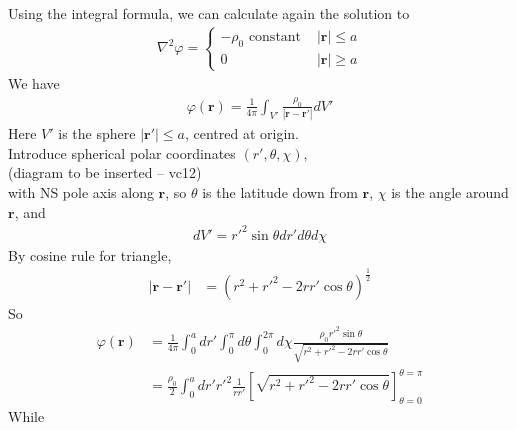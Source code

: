 \documentclass[a4paper]{article}
\begin{document}
\begin{eg}
Using the integral formula, we can calculate again the solution to
\begin{equation*}
\begin{aligned}
\nabla^2\varphi = \left\{
\begin{array}{ll}
-\rho_0 \text{   constant   } & |\mathbf{r}|\leq a\\
0 & |\mathbf{r}|\geq a
\end{array}
\right.
\end{aligned}
\end{equation*}
We have
\begin{equation*}
\begin{aligned}
\varphi\left(\mathbf{r}\right) = \frac{1}{4\pi}\int_{V'} \frac{\rho_0}{|\mathbf{r}-\mathbf{r}'|} dV'
\end{aligned}
\end{equation*}
Here $V'$ is the sphere $|\mathbf{r}'| \leq a$, centred at origin.\\
Introduce spherical polar coordinates $\left(r',\theta,\chi\right)$,\\
(diagram to be inserted -- vc12)\\
with NS pole axis along $\mathbf{r}$, so $\theta$ is the latitude down from $\mathbf{r}$, $\chi$ is the angle around $\mathbf{r}$, and
\begin{equation*}
\begin{aligned}
dV' = r'^2 \sin\theta dr' d\theta d\chi
\end{aligned}
\end{equation*}
By cosine rule for triangle,
\begin{equation*}
\begin{aligned}
|\mathbf{r}-\mathbf{r}'| &= \left(r^2+r'^2 - 2rr' \cos \theta\right) ^\frac{1}{2}
\end{aligned}
\end{equation*}
So
\begin{equation*}
\begin{aligned}
\varphi\left(\mathbf{r}\right) &= \frac{1}{4\pi} \int_0^a dr' \int_0^\pi d\theta \int_0^{2\pi} d\chi \frac{\rho_0 r'^2\sin\theta}{\sqrt{r^2+r'^2-2rr'\cos\theta}}\\
&=\frac{\rho_0}{2} \int_0^a dr' r'^2 \frac{1}{rr'}\left[\sqrt{r^2+r'^2 - 2rr'\cos\theta}\right]_{\theta=0}^{\theta=\pi}
\end{aligned}
\end{equation*}
While 
\begin{equation*}
\begin{aligned}

\end{aligned}
\end{equation*}
\end{eg}
\end{document}
